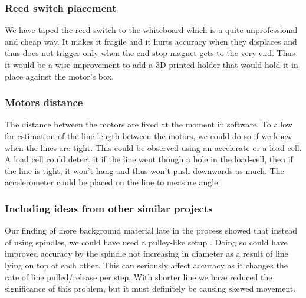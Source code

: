 \subsubsection{Reed switch placement}
We have taped the reed switch to the whiteboard which is a quite unprofessional and cheap way. It makes it fragile and it hurts accuracy when they displaces and thus does not trigger only when the end-stop magnet gets to the very end. Thus it would be a wise improvement to add a 3D printed holder that would hold it in place against the motor's box.

\subsubsection{Motors distance}
The distance between the motors are fixed at the moment in software. To allow for estimation of the line length between the motors, we could do so if we knew when the lines are tight. This could be observed using an accelerate or a load cell. A load cell could detect it if the line went though a hole in the load-cell, then if the line is tight, it won't hang and thus won't push downwards as much. The accelerometer could be placed on the line to measure angle.

\subsubsection{Including ideas from other similar projects}
Our finding of more background material late in the process showed that instead of using spindles, we could have used a pulley-like setup \citep{Vimio:2010:DrawingMachine}. Doing so could have improved accuracy by the spindle not increasing in diameter as a result of line lying on top of each other. This can seriously affect accuracy as it changes the rate of line pulled/release per step. With shorter line we have reduced the significance of this problem, but it must definitely be causing skewed movement. 